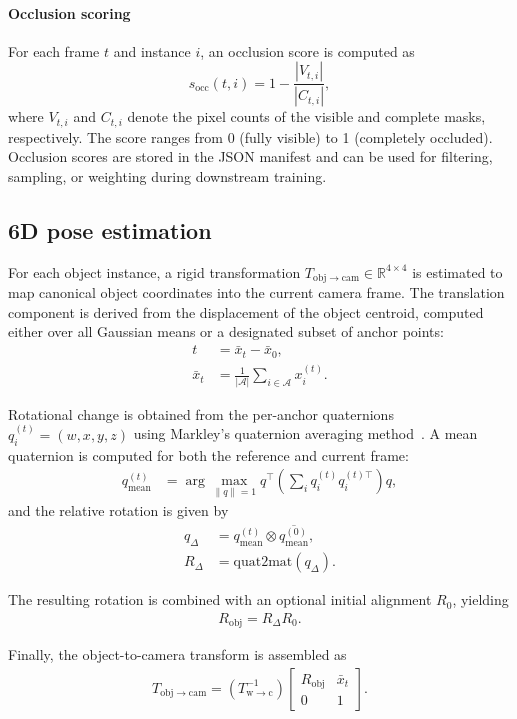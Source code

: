 \paragraph{Occlusion scoring}
For each frame \(t\) and instance \(i\), an occlusion score is computed as
\[
s_{\mathrm{occ}}(t,i) = 1 - \frac{|V_{t,i}|}{|C_{t,i}|},
\]
where \(V_{t,i}\) and \(C_{t,i}\) denote the pixel counts of the visible and complete masks, respectively. The score ranges from 0 (fully visible) to 1 (completely occluded). Occlusion scores are stored in the JSON manifest and can be used for filtering, sampling, or weighting during downstream training.

\subsection{6D pose estimation}
For each object instance, a rigid transformation 
$T_{\mathrm{obj}\rightarrow\mathrm{cam}} \in \mathbb{R}^{4\times4}$ 
is estimated to map canonical object coordinates into the current camera frame. 
The translation component is derived from the displacement of the object centroid, 
computed either over all Gaussian means or a designated subset of anchor points:
\begin{align}
t &= \bar{x}_{t} - \bar{x}_{0}, \\
\bar{x}_{t} &= \frac{1}{|\mathcal{A}|} \sum_{i \in \mathcal{A}} x_i^{(t)}.
\end{align}

Rotational change is obtained from the per-anchor quaternions 
$q_i^{(t)} = (w,x,y,z)$ using Markley’s quaternion averaging method~\cite{markley2007averaging}. 
A mean quaternion is computed for both the reference and current frame:
\begin{align}
q^{(t)}_{\mathrm{mean}} &= 
\arg\max_{\|q\|=1} q^\top
\left(\sum_i q_i^{(t)} q_i^{(t)\top}\right) q,
\end{align}
and the relative rotation is given by
\begin{align}
q_{\Delta} &= q^{(t)}_{\mathrm{mean}} \otimes \overline{q^{(0)}_{\mathrm{mean}}}, \\
R_{\Delta} &= \mathrm{quat2mat}(q_{\Delta}).
\end{align}

The resulting rotation is combined with an optional initial alignment $R_0$, yielding
\begin{align}
R_{\mathrm{obj}} = R_{\Delta} R_0.
\end{align}

Finally, the object-to-camera transform is assembled as
\begin{align}
T_{\mathrm{obj}\rightarrow\mathrm{cam}} =
\left(T_{\mathrm{w}\rightarrow\mathrm{c}}^{-1}\right)
\begin{bmatrix}
R_{\mathrm{obj}} & \bar{x}_{t} \\
0 & 1
\end{bmatrix}.
\end{align}

